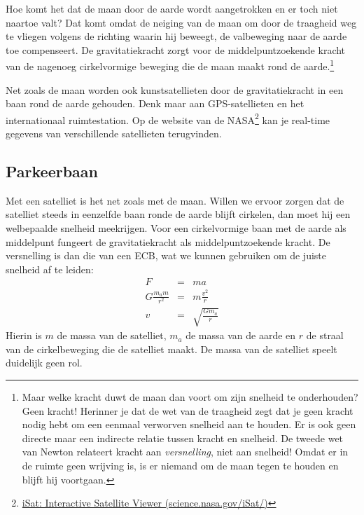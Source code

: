 \documentclass{ximera}
\begin{document}
	\author{Bart Lambregs}
    \xmsource\xmuitleg



Hoe komt het dat de maan door de aarde wordt aangetrokken en er toch niet naartoe valt? Dat komt omdat de neiging van de maan om door de traagheid weg te vliegen volgens de richting waarin hij beweegt, de valbeweging naar de aarde toe compenseert. De gravitatiekracht zorgt voor de middelpuntzoekende kracht van de nagenoeg cirkelvormige beweging die de maan maakt rond de aarde.\footnote{Maar welke kracht duwt de maan dan voort om zijn snelheid te onderhouden? Geen kracht! Herinner je dat de wet van de traagheid zegt dat je geen kracht nodig hebt om een eenmaal verworven snelheid aan te houden. Er is ook geen directe maar een indirecte relatie tussen kracht en snelheid. De tweede wet van Newton relateert kracht aan \textit{versnelling}, niet aan snelheid! Omdat er in de ruimte geen wrijving is, is er niemand om de maan tegen te houden en blijft hij voortgaan.}

Net zoals de maan worden ook kunstsatellieten door de gravitatiekracht in een baan rond de aarde gehouden. Denk maar aan GPS-satellieten en het internationaal ruimtestation. Op de website van de NASA\footnote{\href{http://science.nasa.gov/iSat/}{iSat: Interactive Satellite Viewer (science.nasa.gov/iSat/)}} kan je real-time gegevens van verschillende satellieten terugvinden.


\subsection{Parkeerbaan}

Met een satelliet is het net zoals met de maan. Willen we ervoor zorgen dat de satelliet steeds in eenzelfde baan ronde de aarde blijft cirkelen, dan moet hij een welbepaalde snelheid meekrijgen. Voor een cirkelvormige baan met de aarde als middelpunt fungeert de gravitatiekracht als middelpuntzoekende kracht. De versnelling is dan die van een ECB, wat we kunnen gebruiken om de juiste snelheid af te leiden:
\begin{eqnarray*}
F&=&ma\\
G\frac{m_am}{r^2}&=&m\frac{v^2}{r}\\
v&=&\sqrt{\frac{Gm_a}{r}}
\end{eqnarray*}
Hierin is $m$ de massa van de satelliet, $m_a$ de massa van de aarde en $r$ de straal van de cirkelbeweging die de satelliet maakt. De massa van de satelliet speelt duidelijk geen rol. 
\end{document}
